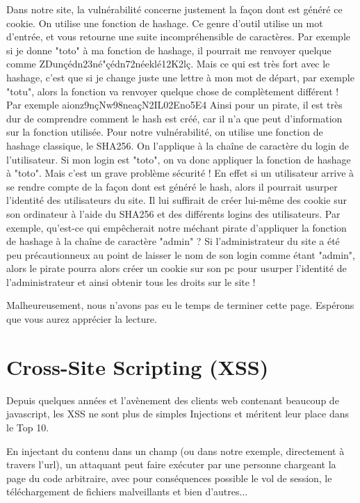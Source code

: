 \documentclass[a4paper,12pt]{article}
\begin{document}
Dans notre site, la vulnérabilité concerne justement la façon dont est généré ce cookie. On utilise une fonction de hashage. Ce genre d'outil utilise un mot d'entrée, et vous retourne une suite incompréhensible de caractères. Par exemple si je donne "toto" à ma fonction de hashage, il pourrait me renvoyer quelque comme ZDunçédn23né"çédn72néeklé12K2lç. Mais ce qui est très fort avec le hashage, c'est que si je change juste une lettre à mon mot de départ, par exemple "totu", alors la fonction va renvoyer quelque chose de complètement différent ! Par exemple aionz9nçNw98neaçN2IL02Eno5E4
Ainsi pour un pirate, il est très dur de comprendre comment le hash est créé, car il n'a que peut d'information sur la fonction utilisée.
Pour notre vulnérabilité, on utilise une fonction de hashage classique, le SHA256. On l'applique à la chaîne de caractère du login de l'utilisateur. Si mon login est "toto", on va donc appliquer la fonction de hashage à "toto". Mais c'est un grave problème sécurité ! En effet si un utilisateur arrive à se rendre compte de la façon dont est généré le hash, alors il pourrait usurper l'identité des utilisateurs du site.
Il lui suffirait de créer lui-même des cookie sur son ordinateur à l'aide du SHA256 et des différents logins des utilisateurs. Par exemple, qu'est-ce qui empêcherait notre méchant pirate d'appliquer la fonction de hashage à la chaîne de caractère "admin" ? Si l'administrateur du site a été peu précautionneux au point de laisser le nom de son login comme étant "admin", alors le pirate pourra alors créer un cookie sur son pc pour usurper l'identité de l’administrateur et ainsi obtenir tous les droits sur le site !

Malheureusement, nous n'avons pas eu le temps de terminer cette page. Espérons que vous aurez apprécier la lecture.


\section{Cross-Site Scripting (XSS)}
Depuis quelques années et l'avènement des clients web contenant beaucoup de javascript, les XSS ne sont plus de simples Injections et méritent leur place dans le Top 10.

En injectant du contenu dans un champ (ou dans notre exemple, directement à travers l'url), un attaquant peut faire exécuter par une personne chargeant la page du code arbitraire, avec pour conséquences possible le vol de session, le téléchargement de fichiers malveillants et bien d'autres...
\end{document}

